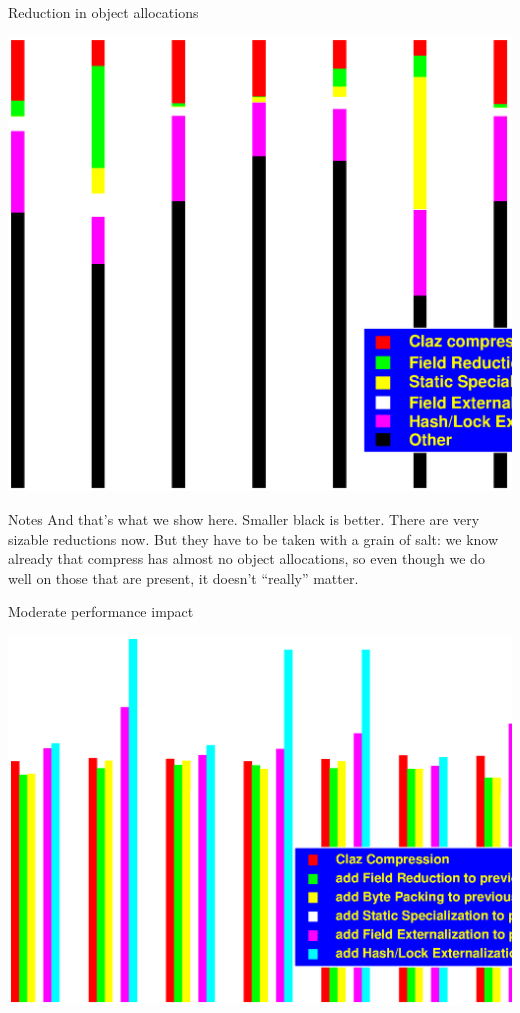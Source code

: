\documentclass[%
pdf,
colorBG,
slideColor,
nototal,
oqe
]{prosper}
\newenvironment{talknotes}{\begin{slide}{Notes}\tiny}{\end{slide}}
\begin{document}
\begin{slide}{Reduction in object allocations}
\begin{center}
\includegraphics[scale=0.45]{Figures/oopsla-objalloc-color.eps}
\end{center}
\end{slide}

\begin{talknotes}
And that's what we show here.  Smaller black is better.
There are very sizable reductions now.
But they have to be taken with a grain of salt: we know already that
compress has almost no object allocations, so even though we do well
on those that are present, it doesn't ``really'' matter.
\end{talknotes}

\begin{slide}{Moderate performance impact}
\begin{center}
\includegraphics[scale=0.45]{Figures/oopsla-speed-color.eps}
\end{center}
\end{slide}
\end{document}
